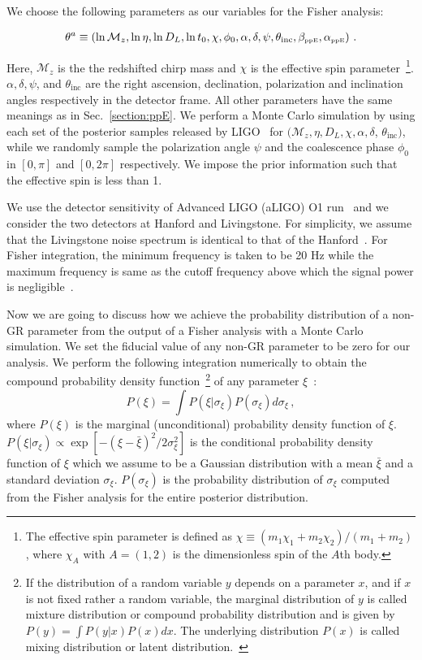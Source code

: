 \documentclass[prd,twocolumn,nofootinbib]{revtex4-1}
\newcommand\be{\begin{equation}}
\newcommand\ba{\begin{eqnarray}}
\newcommand\ee{\end{equation}}
\newcommand\ea{\end{eqnarray}}
\newcommand\bw{\begin{widetext}}
\newcommand\ew{\end{widetext}}
\newcommand{\lb}{\left(}
\newcommand{\rb}{\right)}
\newcommand{\PPE}{{\mbox{\tiny ppE}}}
\begin{document}
We choose the following parameters as our variables for the Fisher analysis:
\bw
\ba
\theta^a\equiv \lb \ln{\mathcal{M}_z}, \ln{\eta}, \ln{D_L}, \ln{t_0}, \chi, \phi_0, \alpha, \delta, \psi, \theta_{\text{inc}}, \beta_{\PPE}, \alpha_{\PPE} \rb\,.
\ea
\ew
Here, $\mathcal{M}_z$ is the the redshifted chirp mass and $\chi$ is the effective spin parameter~\footnote{The effective spin parameter is defined as $\chi\equiv\lb m_1 \chi_1+m_2\chi_2\rb /\lb m_1+m_2\rb$, where $\chi_A$ with $A=(1,2)$ is the dimensionless spin of the $A$th body.}. $\alpha, \delta, \psi$, and  $\theta_{\text{inc}}$ are the right ascension, declination, polarization and inclination angles respectively in the detector frame. All other parameters have the same meanings as in Sec.~\ref{section:ppE}. 
We perform a Monte Carlo simulation by using each set of the posterior samples released by LIGO~\cite{ligo:sample} for $(\mathcal{M}_z, \eta, D_L, \chi, \alpha, \delta$, $\theta_{\text{inc}})$, while we randomly sample the polarization angle $\psi$ and the coalescence phase $\phi_0$ in $[0,\pi]$ and $[0,2\pi]$ respectively.
We impose the prior information such that the effective spin is less than 1.

We use the detector sensitivity of Advanced LIGO (aLIGO) O1 run~\cite{LIGOScientific:2018mvr} and we consider the two detectors at Hanford and Livingstone. For simplicity, we assume that the Livingstone noise spectrum is identical to that of the Hanford~\cite{Yunes:2009yz}. For Fisher integration, the minimum frequency is taken to be 20 Hz while the maximum frequency is same as the cutoff frequency above which the signal power is negligible~\cite{Ajith:2009bn}.


Now we are going to discuss how we achieve the probability distribution of a non-GR parameter from the output of a Fisher analysis with a Monte Carlo simulation. We set the  fiducial value of any non-GR parameter to be zero for our analysis. We perform the following integration numerically to obtain the compound probability density function~\footnote{If the distribution of a random variable $y$ depends on a parameter $x$, and if $x$ is not fixed rather a random variable, the marginal distribution of $y$ is called mixture distribution or compound probability distribution and is given by $P\left(y\right)=\int P\left(y|x\right) P\left(x\right)dx$. The underlying distribution $P\left(x\right)$ is called mixing distribution or latent distribution.~\cite{2016arXiv160204060R}} of any parameter $\xi$~:
\be
\label{eq3:1}
P\lb\xi\rb=\int P\lb \xi|\sigma_{\xi}\rb P\lb \sigma_{\xi}\rb d\sigma_{\xi}\,,
\ee
where $P\lb\xi\rb$ is the marginal (unconditional) probability density function of $\xi$. $P\lb \xi|\sigma_{\xi}\rb \propto \exp[-(\xi-\bar \xi)^2/2\sigma_{\xi}^2]$ is the conditional probability density function of $\xi$ which we assume to be a Gaussian distribution with a mean $\bar \xi$ and a standard deviation $\sigma_\xi$. $P\lb\sigma_\xi\rb$ is the probability distribution of $\sigma_\xi$ computed from the Fisher analysis for the entire posterior distribution.
\end{document}
